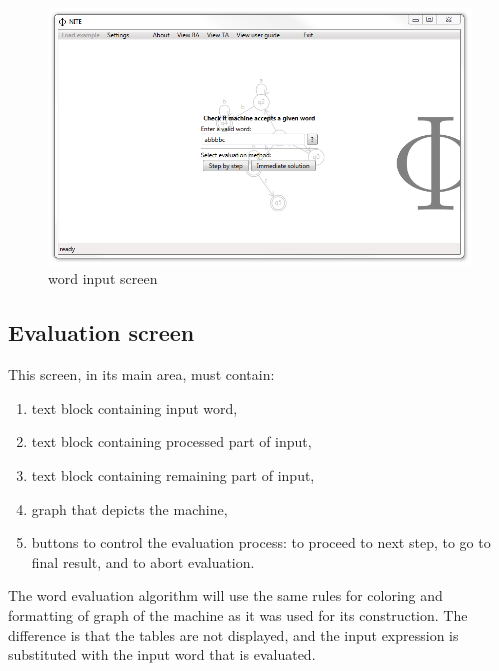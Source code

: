 \documentclass{article}
\begin{document}
\begin{figure}[ht!]
  \centering
  \includegraphics[width=.9\textwidth]{../../graphics/Screen5.png}
  \caption{word input screen}
\end{figure}

\subsection{Evaluation screen}
This screen, in its main area, must contain:
\begin{enumerate}

  \item text block containing input word,

  \item text block containing processed part of input,

  \item text block containing remaining part of input,

  \item graph that depicts the machine,

  \item buttons to control the evaluation process: to proceed to next step, to go to final result,
  and to abort evaluation.

\end{enumerate}

\vspace{10pt} \noindent
The word evaluation algorithm will use the same rules for coloring and formatting of graph of the
machine as it was used for its construction. The difference is that the tables are not displayed,
and the input expression is substituted with the input word that is evaluated.

\newpage
\end{document}
